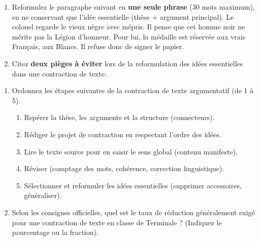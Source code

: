 \documentclass[11pt]{article}
\begin{document}
\begin{exercice}
\begin{enumerate}
    \item Reformulez le paragraphe suivant en \textbf{une seule phrase} (30 mots maximum), en ne conservant que l'idée essentielle (thèse + argument principal).
    \og Le colonel regarde le vieux nègre avec mépris. Il pense que cet homme noir ne mérite pas la Légion d'honneur. Pour lui, la médaille est réservée aux vrais Français, aux Blancs. Il refuse donc de signer le papier. \fg{}
    \item Citez \textbf{deux pièges à éviter} lors de la reformulation des idées essentielles dans une contraction de texte.
\end{enumerate}
\end{exercice}

\begin{exercice}
\begin{enumerate}
    \item Ordonnez les étapes suivantes de la contraction de texte argumentatif (de 1 à 5).
    \begin{enumerate}
        \item Repérer la thèse, les arguments et la structure (connecteurs).
        \item Rédiger le projet de contraction en respectant l'ordre des idées.
        \item Lire le texte source pour en saisir le sens global (contenu manifeste).
        \item Réviser (comptage des mots, cohérence, correction linguistique).
        \item Sélectionner et reformuler les idées essentielles (supprimer accessoires, généraliser).
    \end{enumerate}
    \item Selon les consignes officielles, quel est le taux de réduction généralement exigé pour une contraction de texte en classe de Terminale ? (Indiquez le pourcentage ou la fraction).
\end{enumerate}
\end{exercice}
\end{document}
